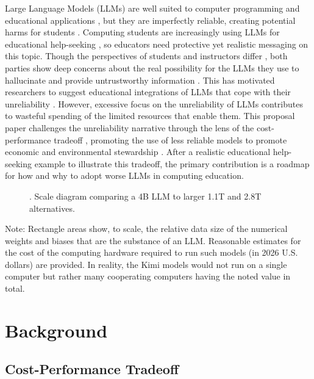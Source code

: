 Large Language Models (LLMs) are well suited to computer programming and educational applications \cite{pratherHypeComprehensiveReview2025}, but they are imperfectly reliable, creating potential harms for students \cite{falknerEffectiveUseLarge2026,pratherRobotsAreHere2023,wangLargeLanguageModels2025,zhouTeachersAreConfused2024a}. Computing students are increasingly using LLMs for educational help-seeking \cite{houEffectsGenerativeAI2024}, so educators need protective yet realistic messaging on this topic. Though the perspectives of students and instructors differ \cite{zastudilGenerativeAIComputing2023}, both parties show deep concerns about the real possibility for the LLMs they use to hallucinate and provide untrustworthy information \cite{pratherRobotsAreHere2023}. This has motivated researchers to suggest educational integrations of LLMs that cope with their unreliability \cite{falknerEffectiveUseLarge2026}. However, excessive focus on the unreliability of LLMs contributes to wasteful spending of the limited resources that enable them. This proposal paper challenges the unreliability narrative through the lens of the cost-performance tradeoff \cite{dingHybridLlmCostefficient2024}, promoting the use of less reliable models to promote economic and environmental stewardship \cite{renReconcilingContrastingNarratives2024}. After a realistic educational help-seeking example to illustrate this tradeoff, the primary contribution is a roadmap for how and why to adopt worse LLMs in computing education.

\begin{figure}
\centering

\caption{. Scale diagram comparing a 4B LLM to larger 1.1T and 2.8T alternatives.}
\end{figure}

Note: Rectangle areas show, to scale, the relative data size of the numerical weights and biases that are the substance of an LLM. Reasonable estimates for the cost of the computing hardware required to run such models (in 2026 U.S. dollars) are provided. In reality, the Kimi models would not run on a single computer but rather many cooperating computers having the noted value in total.

\section{Background}\label{background}

\subsection{Cost-Performance Tradeoff}\label{cost-performance-tradeoff}

